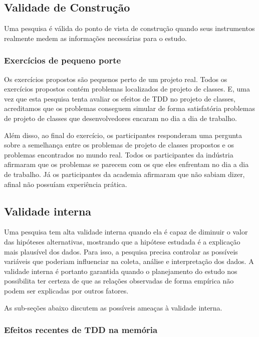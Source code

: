 \documentclass[conference]{IEEEtran}
\begin{document}
\subsection{Validade de Construção}

Uma pesquisa é válida do ponto de vista de construção quando seus instrumentos realmente
medem as informações necessárias para o estudo.

\subsubsection{Exercícios de pequeno porte}

Os exercícios propostos são pequenos perto de um projeto real. Todos os exercícios propostos contém
problemas localizados de projeto de classes. E, uma vez que esta pesquisa tenta avaliar os efeitos de TDD no projeto de classes, 
acreditamos que os problemas conseguem simular de forma satisfatória
problemas de projeto de classes que desenvolvedores encaram no dia a dia de trabalho.

Além disso, ao final do exercício, os participantes responderam uma pergunta sobre a semelhança
entre os problemas de projeto de classes propostos e os problemas encontrados no mundo real.
Todos os participantes da indústria afirmaram que os problemas se parecem com os que eles enfrentam
no dia a dia de trabalho. Já os participantes da academia afirmaram que não sabiam dizer, afinal não
possuíam experiência prática.

\subsection{Validade interna}

Uma pesquisa tem alta validade interna quando ela é capaz de diminuir o valor das hipóteses alternativas, mostrando
que a hipótese estudada é a explicação mais plausível dos dados. Para isso, a pesquisa precisa controlar as possíveis
variáveis que poderiam influenciar na coleta, análise e interpretação dos dados. A validade interna é portanto
garantida quando o planejamento do estudo nos possibilita ter certeza de que as relações observadas de
forma empírica não podem ser explicadas por outros fatores.

As sub-seções abaixo discutem as possíveis ameaças à validade interna.

\subsubsection{Efeitos recentes de TDD na memória}
\end{document}
